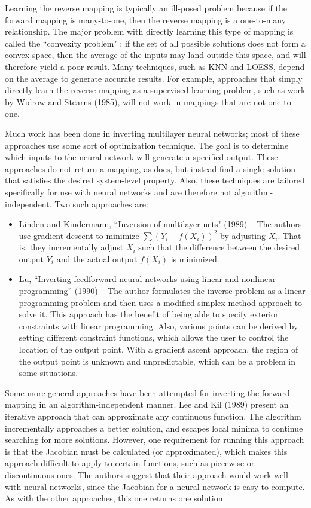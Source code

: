 Learning the reverse mapping is typically an ill-posed problem because if the forward mapping is many-to-one, then the reverse mapping is a one-to-many relationship.
The major problem with directly learning this type of mapping is called the ``convexity problem" \cite{jordan-forward}: if the set of all possible solutions does not form a convex space, then the average of the inputs may land outside this space, and will therefore yield a poor result.
Many techniques, such as KNN and LOESS, depend on the average to generate accurate results.
For example,  approaches that simply directly learn the reverse mapping as a supervised learning problem, such as work by Widrow and Stearns (1985),\nocite{widrow1985adaptive} will not work in mappings that are not one-to-one.

Much work has been done in inverting multilayer neural networks; most of these approaches use some sort of optimization technique.
The goal is to determine which inputs to the neural network will generate a specified output.
These approaches do not return a mapping, as \fw does, but instead find a single solution that satisfies the desired system-level property.
Also, these techniques are tailored specifically for use with neural networks and are therefore not algorithm-independent.
Two such approaches are:
\begin{itemize}
\item Linden and Kindermann, ``Inversion of multilayer nets" (1989)\nocite{linden1989inversion} --
The authors use gradient descent to minimize $\sum (Y_i - f(X_i))^2$ by adjusting $X_i$.
That is, they incrementally adjust $X_i$ such that the difference between the desired output $Y_i$ and the actual output $f(X_i)$ is minimized.
\item Lu,  ``Inverting feedforward neural networks using linear and nonlinear programming'' (1990)\nocite{lu1999inverting} -- 
The author formulates the inverse problem as a linear programming problem and then uses a modified simplex method approach to solve it.
This approach has the benefit of being able to specify exterior constraints with linear programming.
Also, various points can be derived by setting different constraint functions, which allows the user to control the location of the output point.
With a gradient ascent approach, the region of the output point is unknown and unpredictable, which can be a problem in some situations.
\end{itemize}

Some more general approaches have been attempted for inverting the forward mapping in an algorithm-independent manner.
Lee and Kil (1989)\nocite{lee1994inverse} present an iterative approach that can approximate any continuous function.
The algorithm incrementally approaches a better solution, and escapes local minima to continue searching for more solutions.
However, one requirement for running this approach is that the Jacobian must be calculated (or approximated), which makes this approach difficult to apply to certain functions, such as piecewise or discontinuous ones.
The authors suggest that their approach would work well with neural networks, since the Jacobian for a neural network is easy to compute.
As with the other approaches, this one returns one solution.

